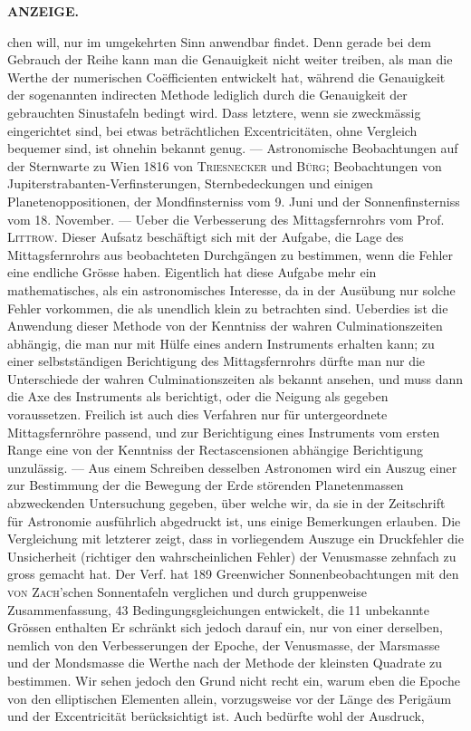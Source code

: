 \clearpage
\thispagestyle{empty}
\noindent{}%
%
\parbox[t]{\dimexpr\linewidth-24mm\relax}{\centering\footnotesize\bfseries ANZEIGE.\par}%
\makebox[12mm][r]{}\par\medskip
\noindent chen will, nur im umgekehrten Sinn anwendbar findet. Denn gerade bei dem Gebrauch der Reihe kann man die Genauigkeit nicht weiter treiben, als man die Werthe der numerischen Coëfficienten entwickelt hat, während die Genauigkeit der sogenannten indirecten Methode lediglich durch die Genauigkeit der gebrauchten Sinustafeln bedingt wird. Dass letztere, wenn sie zweckmässig eingerichtet sind, bei etwas beträchtlichen Excentricitäten, ohne Vergleich bequemer sind, ist ohnehin bekannt genug. --- Astronomische Beobachtungen auf der Sternwarte zu Wien 1816 von \textsc{Triesnecker} und \textsc{Bürg}; Beobachtungen von Jupiterstrabanten-Verfinsterungen, Sternbedeckungen und einigen Planetenoppositionen, der Mondfinsterniss vom 9. Juni und der Sonnenfinsterniss vom 18. November. --- Ueber die Verbesserung des Mittagsfernrohrs vom Prof. \textsc{Littrow}. Dieser Aufsatz beschäftigt sich mit der Aufgabe, die Lage des Mittagsfernrohrs aus beobachteten Durchgängen zu bestimmen, wenn die Fehler eine endliche Grösse haben. Eigentlich hat diese Aufgabe mehr ein mathematisches, als ein astronomisches Interesse, da in der Ausübung nur solche Fehler vorkommen, die als unendlich klein zu betrachten sind. Ueberdies ist die Anwendung dieser Methode von der Kenntniss der wahren Culminationszeiten abhängig, die man nur mit Hülfe eines andern Instruments erhalten kann; zu einer selbstständigen Berichtigung des Mittagsfernrohrs dürfte man nur die Unterschiede der wahren Culminationszeiten als bekannt ansehen, und muss dann die Axe des Instruments als berichtigt, oder die Neigung als gegeben voraussetzen. Freilich ist auch dies Verfahren nur für untergeordnete Mittagsfernröhre passend, und zur Berichtigung eines Instruments vom ersten Range eine von der Kenntniss der Rectascensionen abhängige Berichtigung unzulässig. --- Aus einem Schreiben desselben Astronomen wird ein Auszug einer zur Bestimmung der die Bewegung der Erde störenden Planetenmassen abzweckenden Untersuchung gegeben, über welche wir, da sie in der Zeitschrift für Astronomie ausführlich abgedruckt ist, uns einige Bemerkungen erlauben. Die Vergleichung mit letzterer zeigt, dass in vorliegendem Auszuge ein Druckfehler die Unsicherheit (richtiger den wahrscheinlichen Fehler) der Venusmasse zehnfach zu gross gemacht hat. Der Verf. hat 189 Greenwicher Sonnenbeobachtungen mit den \textsc{von Zach}'schen Sonnentafeln verglichen und durch gruppenweise Zusammenfassung, 43 Bedingungsgleichungen entwickelt, die 11 unbekannte Grössen enthalten Er schränkt sich jedoch darauf ein, nur von einer derselben, nemlich von den Verbesserungen der Epoche, der Venusmasse, der Marsmasse und der Mondsmasse die Werthe nach der Methode der kleinsten Quadrate zu bestimmen. Wir sehen jedoch den Grund nicht recht ein, warum eben die Epoche von den elliptischen Elementen allein, vorzugsweise vor der Länge des Perigäum und der Excentricität berücksichtigt ist. Auch bedürfte wohl der Ausdruck, 